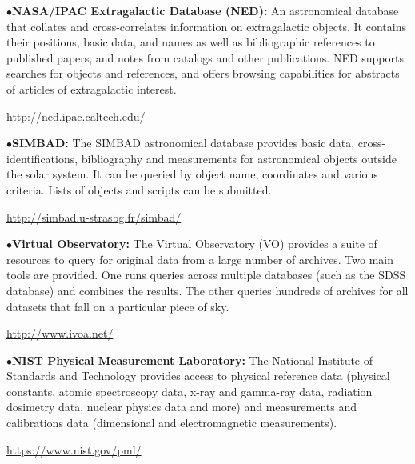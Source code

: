 \medskip

\item{$\bullet$}{\bf NASA/IPAC Extragalactic Database (NED):}
An astronomical database that collates and cross-correlates information on extragalactic objects. It contains their positions, basic data, and names as well as bibliographic references to published papers, and notes from catalogs and other publications. NED supports searches for objects and references, and offers browsing capabilities for abstracts of articles of extragalactic interest.
	\item{}\qquad\url{http://ned.ipac.caltech.edu/}

\medskip

\item{$\bullet$}{\bf SIMBAD:}
The SIMBAD astronomical database provides basic data, cross-identifications, bibliography and measurements for astronomical objects outside the solar system. It can be queried by object name, coordinates and various criteria. Lists of objects and scripts can be submitted.
	\item{}\qquad\url{http://simbad.u-strasbg.fr/simbad/}

\medskip

\item{$\bullet$}{\bf Virtual Observatory:}
The Virtual Observatory (VO) provides a suite of resources to query for original data from a large number of archives. Two main tools are provided. One runs queries across multiple databases (such as the SDSS database) and combines the results. The other queries hundreds of archives for all datasets that fall on a particular piece of sky.
	\item{}\qquad\url{http://www.ivoa.net/}

\medskip



\item{$\bullet$}{\bf NIST Physical Measurement Laboratory:} 
The National Institute of Standards and Technology provides access to physical reference data (physical constants, atomic spectroscopy data, x-ray and gamma-ray data, radiation dosimetry data, nuclear physics data and more) and measurements and calibrations data (dimensional and electromagnetic measurements).
	\item{}\qquad\url{https://www.nist.gov/pml/}

\medskip

